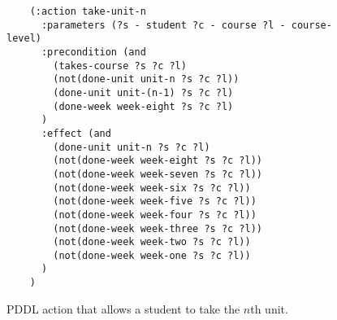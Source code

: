 \begin{figure}[t]
    \begin{lstlisting}
    (:action take-unit-n
      :parameters (?s - student ?c - course ?l - course-level)
      :precondition (and 
        (takes-course ?s ?c ?l)
        (not(done-unit unit-n ?s ?c ?l))
        (done-unit unit-(n-1) ?s ?c ?l)
        (done-week week-eight ?s ?c ?l)
      )
      :effect (and
        (done-unit unit-n ?s ?c ?l)
        (not(done-week week-eight ?s ?c ?l))
        (not(done-week week-seven ?s ?c ?l))
        (not(done-week week-six ?s ?c ?l))
        (not(done-week week-five ?s ?c ?l))
        (not(done-week week-four ?s ?c ?l))
        (not(done-week week-three ?s ?c ?l))
        (not(done-week week-two ?s ?c ?l))
        (not(done-week week-one ?s ?c ?l))
      )
    )
    \end{lstlisting}
    \caption{PDDL action that allows a student to take the $n$th unit.}\label{fig:take-unit-n}
\end{figure}